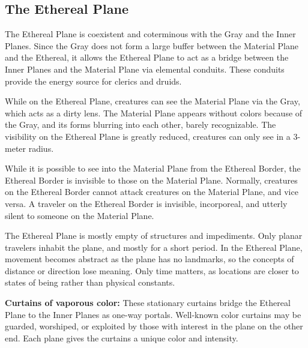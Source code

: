 \subsection{The Ethereal Plane}
The Ethereal Plane is coexistent and coterminous with the Gray and the Inner Planes. Since the Gray does not form a large buffer between the Material Plane and the Ethereal, it allows the Ethereal Plane to act as a bridge between the Inner Planes and the Material Plane via elemental conduits. These conduits provide the energy source for clerics and druids.

While on the Ethereal Plane, creatures can see the Material Plane via the Gray, which acts as a dirty lens. The Material Plane appears without colors because of the Gray, and its forms blurring into each other, barely recognizable. The visibility on the Ethereal Plane is greatly reduced, creatures can only see in a 3-meter radius.

While it is possible to see into the Material Plane from the Ethereal Border, the Ethereal Border is invisible to those on the Material Plane. Normally, creatures on the Ethereal Border cannot attack creatures on the Material Plane, and vice versa. A traveler on the Ethereal Border is invisible, incorporeal, and utterly silent to someone on the Material Plane.

The Ethereal Plane is mostly empty of structures and impediments. Only planar travelers inhabit the plane, and mostly for a short period.
In the Ethereal Plane, movement becomes abstract as the plane has no landmarks, so the concepts of distance or direction lose meaning. Only time matters, as locations are closer to states of being rather than physical constants.


\textbf{Curtains of vaporous color:} These stationary curtains bridge the Ethereal Plane to the Inner Planes as one-way portals. Well-known color curtains may be guarded, worshiped, or exploited by those with interest in the plane on the other end. Each plane gives the curtains a unique color and intensity.

